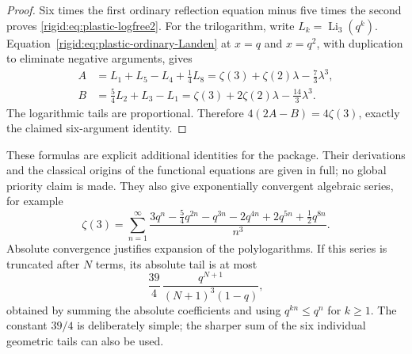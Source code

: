 \begin{proof}
Six times the first ordinary reflection equation minus five times
the second proves \eqref{rigid:eq:plastic-logfree2}.
For the trilogarithm, write $L_k=\operatorname{Li}_3(q^k)$.
Equation~\eqref{rigid:eq:plastic-ordinary-Landen} at $x=q$ and $x=q^2$,
with duplication to eliminate negative arguments, gives
\begin{align*}
A&=L_1+L_5-L_4+\frac14L_8
  =\zeta(3)+\zeta(2)\lambda-\frac73\lambda^3,\\
B&=\frac54L_2+L_3-L_1
  =\zeta(3)+2\zeta(2)\lambda-\frac{14}3\lambda^3.
\end{align*}
The logarithmic tails are proportional.  Therefore
$4(2A-B)=4\zeta(3)$, exactly the claimed six-argument identity.
\end{proof}

These formulas are explicit additional identities for the package.
Their derivations and the classical origins of the functional
equations are given in full; no global priority claim is made.
They also give exponentially convergent algebraic series, for example
\begin{equation}
\zeta(3)=\sum_{n=1}^{\infty}
\frac{3q^n-\tfrac54q^{2n}-q^{3n}-2q^{4n}
                 +2q^{5n}+\tfrac12q^{8n}}{n^3}.
\label{rigid:eq:plastic-zeta3-series}
\end{equation}
Absolute convergence justifies expansion of the polylogarithms.
If this series is truncated after $N$ terms, its absolute tail is
at most
\[
\frac{39}{4}\,
\frac{q^{N+1}}{(N+1)^3(1-q)},
\]
obtained by summing the absolute coefficients and using
$q^{kn}\le q^n$ for $k\ge1$.  The constant $39/4$ is deliberately
simple; the sharper sum of the six individual geometric tails can
also be used.
